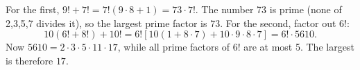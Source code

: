 For the first, $ 9!+7!=7!(9\cdot8+1)=73\cdot7!$. The number 73 is prime (none of 2,3,5,7 divides it), so the largest prime factor is $\boxed{73}$. For the second, factor out $ 6!$: \[10(6!+8!)+10!=6!\left[10(1+8\cdot7)+10\cdot9\cdot8\cdot7\right]=6!\cdot5610.\]Now $ 5610=2\cdot3\cdot5\cdot11\cdot17 $, while all prime factors of $ 6!$ are at most 5. The largest is therefore $\boxed{17}$.

